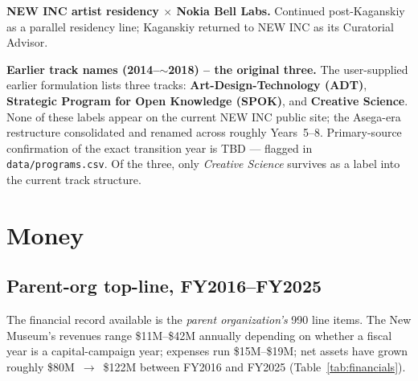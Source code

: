 \documentclass[10pt,letterpaper,twocolumn]{article}
\begin{document}
\textbf{NEW INC artist residency $\times$ Nokia Bell Labs.} Continued post-Kaganskiy as a parallel residency line; Kaganskiy returned to NEW INC as its Curatorial Advisor.

\textbf{Earlier track names (2014--$\sim$2018) -- the original three.} The user-supplied earlier formulation lists three tracks: \textbf{Art-Design-Technology (ADT)}, \textbf{Strategic Program for Open Knowledge (SPOK)}, and \textbf{Creative Science}. None of these labels appear on the current NEW INC public site; the Asega-era restructure consolidated and renamed across roughly Years~5--8. Primary-source confirmation of the exact transition year is TBD --- flagged in \texttt{data/programs.csv}. Of the three, only \emph{Creative Science} survives as a label into the current track structure.

\section{Money}\label{sec:money}

\subsection{Parent-org top-line, FY2016--FY2025}

The financial record available is the \emph{parent organization's} 990 line items. The New Museum's revenues range \$11M--\$42M annually depending on whether a fiscal year is a capital-campaign year; expenses run \$15M--\$19M; net assets have grown roughly \$80M~$\rightarrow$~\$122M between FY2016 and FY2025 (Table~\ref{tab:financials}).
\end{document}
